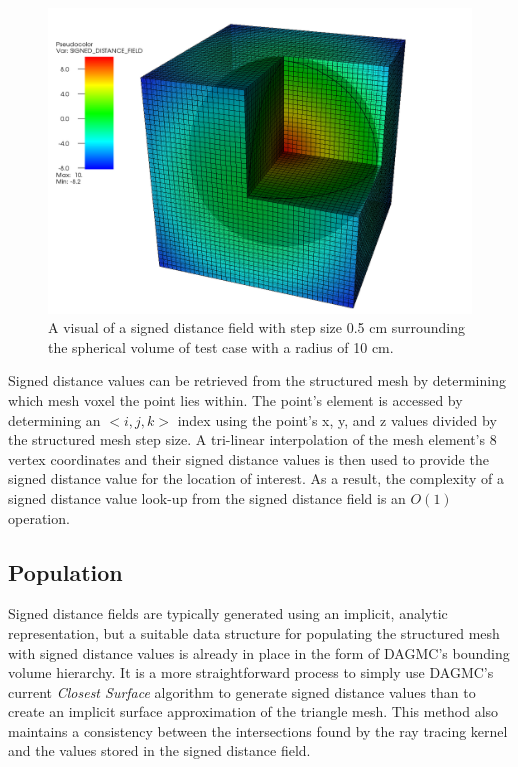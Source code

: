 \begin{figure}
  \centering
  \includegraphics[scale=0.3]{../images/sdf_sphere.png}
  \caption[Visualization of a signed distance field created in MOAB.]{A visual
    of a signed distance field with step size 0.5 cm surrounding the spherical
    volume of test case with a radius of 10 cm.}
  \label{fig:sdf_sphere}
\end{figure}

Signed distance values can be retrieved from the structured mesh by determining
which mesh voxel the point lies within. The point's element is accessed by
determining an $<i,j,k>$ index using the point's x, y, and z values divided by
the structured mesh step size. A tri-linear interpolation of the mesh element's 8
vertex coordinates and their signed distance values is then used to provide the
signed distance value for the location of interest. As a result, the complexity
of a signed distance value look-up from the signed distance field is an
$O(1)$ operation.

\subsection{Population}

Signed distance fields are typically generated using an implicit, analytic
representation, but a suitable data structure for populating the structured mesh
with signed distance values is already in place in the form of DAGMC's bounding
volume hierarchy. It is a more straightforward process to simply use DAGMC's
current \textit{Closest Surface} algorithm to generate signed distance values than to
create an implicit surface approximation of the triangle mesh. This method also
maintains a consistency between the intersections found by the ray tracing
kernel and the values stored in the signed distance field.


